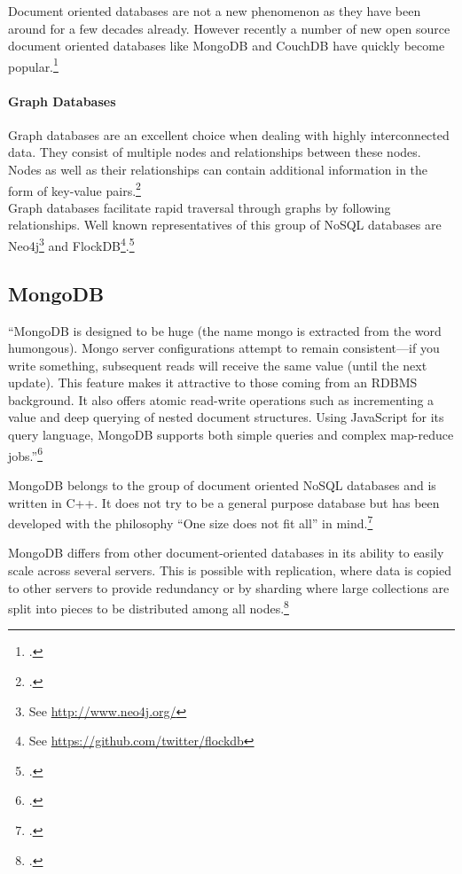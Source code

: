 Document oriented databases are not a new phenomenon as they have been around
for a few decades already. However recently a number of new open source document 
oriented databases like MongoDB and CouchDB have quickly become popular.\footcite[Cf.][p. 18 et sq.]{Tiwari_2011}


\paragraph{Graph Databases}
\label{sec:nosql-graph}
Graph databases are an excellent choice when dealing with highly interconnected
data. They consist of multiple nodes and relationships between these nodes.
Nodes as well as their relationships can contain additional information in the
form of key-value pairs.\footcite[Cf.][6]{Redmond_2012}\\
Graph databases facilitate rapid traversal through graphs by following
relationships. Well known representatives of this group of NoSQL databases are
Neo4j\footnote{See \url{http://www.neo4j.org/}} and FlockDB\footnote{See
\url{https://github.com/twitter/flockdb}}.\footcite[Cf.][19]{Tiwari_2011}


\subsection{MongoDB}
\label{sec:mongodb}


``MongoDB is designed to be huge (the name mongo is extracted from the word
humongous). Mongo server configurations attempt to remain consistent—if
you write something, subsequent reads will receive the same value (until the
next update). This feature makes it attractive to those coming from an RDBMS
background. It also offers atomic read-write operations such as incrementing
a value and deep querying of nested document structures. Using JavaScript
for its query language, MongoDB supports both simple queries and complex
map-reduce jobs.''\footcite[][6]{Redmond_2012}

MongoDB belongs to the group of document oriented NoSQL databases and is written
in C++. It does not try to be a general purpose database but has been developed
with the philosophy ``One size does not fit all'' in mind.\footcite[Cf.][3]{Plugge_2010}

MongoDB differs from other document-oriented databases in its ability to easily
scale across several servers. This is possible with replication, where data is 
copied to other servers to provide redundancy or by sharding where large
collections are split into pieces to be distributed among all
nodes.\footcite[Cf.][165]{Redmond_2012}

